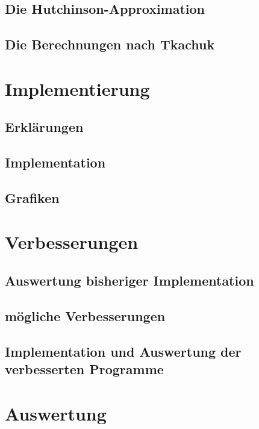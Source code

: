 \documentclass[ngerman,BCOR=4mm]{tudscrreprt}
\theoremstyle{plain} %
\theoremstyle{definition} %
\theoremstyle{remark}
\begin{document}
      \section{Die Hutchinson-Approximation}

      \section{Die Berechnungen nach Tkachuk}

\chapter{Implementierung}
\label{sec: Programmieren}
      \section{Erklärungen}

      \section{Implementation}

      \section{Grafiken}

\chapter{Verbesserungen}
\label{sec: Verbesserungen}
      \section{Auswertung bisheriger Implementation}

      \section{mögliche Verbesserungen}

      \section{Implementation und Auswertung der verbesserten Programme}

\chapter{Auswertung}
\label{sec: Auswertung}
\end{document}

